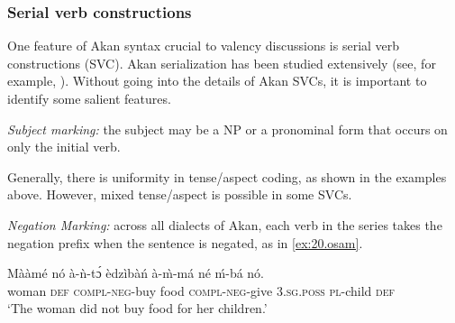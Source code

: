 \documentclass[output=paper]{langsci/langscibook}
\begin{document}
\subsubsection{Serial verb constructions}\label{§2.3.4:serial.osam}

One feature of Akan syntax crucial to valency discussions is serial verb constructions (\textsc{SVC}). Akan serialization has been studied extensively (see, for example, \citealt{lord1973,schachter1974,essilfie1977,forson1990,osam1994a,osam1994b,osam1997,osam2004,osam2014,agyeman2002,hellanetal2003,kambon2012}). Without going into the details of Akan SVCs, it is important to identify some salient features.

\textit{Subject marking:} the subject may be a NP or a pronominal form that occurs on only the initial verb. 

\ea
\label{ex:19.osam}
	\z

	\z
\z

Generally, there is uniformity in tense/aspect coding, as shown in the examples above. However, mixed tense/aspect is possible in some SVCs. 


\textit{Negation Marking:} across all dialects of Akan, each verb in the series takes the negation prefix when the sentence is negated, as in \ref{ex:20.osam}. 


\ea
\label{ex:20.osam}
\gll M\`{a}\`{a}m\'{e}  n\'{o}  \`{a}-\`{n}-tɔ́      \`{e}dz\`{i}b\`{a}\'{n}  \`{a}-\`{m}-m\'{a}  n\'{e}    \'{m}-b\'{a}    n\'{o}. \\
     woman  \textsc{def}  \textsc{compl}-\textsc{neg}-buy  food    \textsc{compl}-\textsc{neg}-give \textsc{3.sg.poss}  \textsc{pl}-child  \textsc{def}\\
\glt `The woman did not buy food for her children.'
\z
\end{document}
